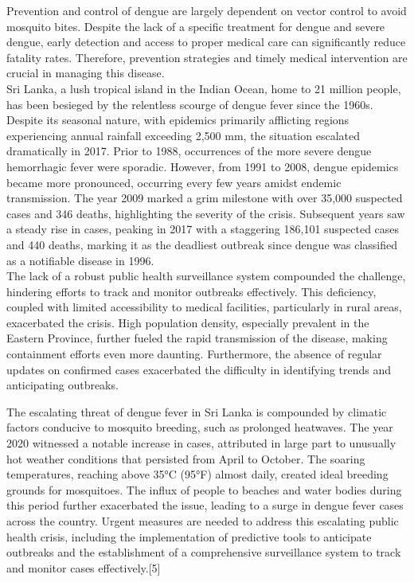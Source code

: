 \documentclass[conference]{IEEEtran}
\begin{document}
Prevention and control of dengue are largely dependent on vector control
to avoid mosquito bites. Despite the lack of a specific treatment for
dengue and severe dengue, early detection and access to proper medical
care can significantly reduce fatality rates. Therefore, prevention
strategies and timely medical intervention are crucial in managing
this disease. \\

Sri Lanka, a lush tropical island in the Indian Ocean, home to 21 million
people, has been besieged by the relentless scourge of dengue fever since
the 1960s. Despite its seasonal nature, with epidemics primarily afflicting
regions experiencing annual rainfall exceeding 2,500 mm, the situation
escalated dramatically in 2017. Prior to 1988, occurrences of the more
severe dengue hemorrhagic fever were sporadic. However, from 1991 to 2008,
dengue epidemics became more pronounced, occurring every few years amidst
endemic transmission. The year 2009 marked a grim milestone with over 35,000
suspected cases and 346 deaths, highlighting the severity of the crisis.
Subsequent years saw a steady rise in cases, peaking in 2017 with a
staggering 186,101 suspected cases and 440 deaths, marking it as the
deadliest outbreak since dengue was classified as a notifiable disease in 1996. \\

The lack of a robust public health surveillance system compounded the
challenge, hindering efforts to track and monitor outbreaks effectively.
This deficiency, coupled with limited accessibility to medical facilities,
particularly in rural areas, exacerbated the crisis. High population density,
especially prevalent in the Eastern Province, further fueled the rapid
transmission of the disease, making containment efforts even more daunting.
Furthermore, the absence of regular updates on confirmed cases exacerbated
the difficulty in identifying trends and anticipating outbreaks.

The escalating threat of dengue fever in Sri Lanka is compounded by climatic
factors conducive to mosquito breeding, such as prolonged heatwaves.
The year 2020 witnessed a notable increase in cases, attributed in
large part to unusually hot weather conditions that persisted from
April to October. The soaring temperatures, reaching above 35°C (95°F)
almost daily, created ideal breeding grounds for mosquitoes. The influx of
people to beaches and water bodies during this period further exacerbated
the issue, leading to a surge in dengue fever cases across the country.
Urgent measures are needed to address this escalating public health crisis,
including the implementation of predictive tools to anticipate outbreaks and
the establishment of a comprehensive surveillance system to track and
monitor cases effectively.[5]
\end{document}
